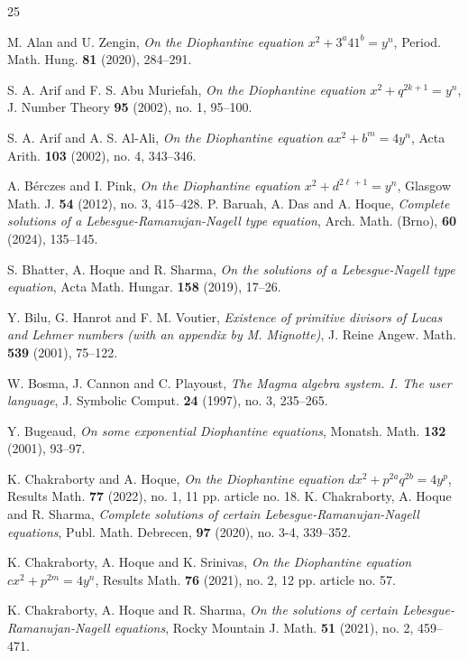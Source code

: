 \documentclass[12pt, 14paper,reqno]{amsart}
\theoremstyle{plain}
\theoremstyle{proof}
\numberwithin{equation}{section}
\begin{document}
\begin{thebibliography}{25}

 M. Alan and U. Zengin, {\it On the Diophantine equation $x^2 + 3^a41^b = y^n$}, Period. Math. Hung. {\bf 81} (2020), 284--291.

 S. A. Arif and F. S.  Abu Muriefah,  {\it On the Diophantine equation $x^2 + q^{2k+1}= y^n$},  J. Number Theory {\bf 95} (2002), no. 1, 95--100.

 S. A. Arif and A. S. Al-Ali, {\it On the Diophantine equation $ax^2+b^m=4y^n$},  Acta Arith. {\bf 103} (2002), no. 4, 343--346.

 A. B\'erczes and I.  Pink,  {\it On the Diophantine equation $x^2 +d^{2\ell+1} = y^n$}, Glasgow Math. J. {\bf 54} (2012), no. 3, 415--428.
 P. Baruah, A. Das and A. Hoque, {\it Complete solutions of a Lebesgue-Ramanujan-Nagell type equation}, Arch. Math. (Brno), {\bf 60} (2024), 135--145. 

 S. Bhatter, A. Hoque and R. Sharma, {\it On the solutions of a Lebesgue-Nagell type equation},  Acta Math. Hungar. {\bf 158} (2019), 17--26.

 Y. Bilu, G. Hanrot and F. M. Voutier, {\it Existence of primitive divisors of Lucas and Lehmer numbers (with an appendix by M. Mignotte)}, J. Reine Angew. Math. {\bf 539} (2001), 75--122.

 W. Bosma, J. Cannon and C. Playoust, {\it The Magma algebra system. I. The user language}, J. Symbolic Comput. {\bf 24} (1997), no. 3, 235--265.

 Y. Bugeaud, {\it On some exponential Diophantine equations}, Monatsh. Math. {\bf 132} (2001), 93--97.

 K. Chakraborty and A. Hoque, {\it On the Diophantine equation $ dx^2+p^{2a}q^{2b}=4y^p$}, Results Math.  {\bf 77} (2022), no. 1, 11 pp. article no. 18.
 K. Chakraborty, A. Hoque and R. Sharma, {\it Complete solutions of certain Lebesgue-Ramanujan-Nagell equations}, Publ. Math. Debrecen, {\bf 97} (2020), no. 3-4, 339--352.

 K. Chakraborty, A. Hoque and K. Srinivas, {\it On the Diophantine equation $cx^2+p^{2m}=4y^n$}, Results Math. {\bf 76} (2021), no. 2, 12 pp. article no. 57.

 K. Chakraborty, A. Hoque and R. Sharma, {\it On the solutions of certain Lebesgue-Ramanujan-Nagell equations}, Rocky Mountain J. Math. {\bf 51} (2021), no. 2, 459--471.


\end{thebibliography}
\end{document}
